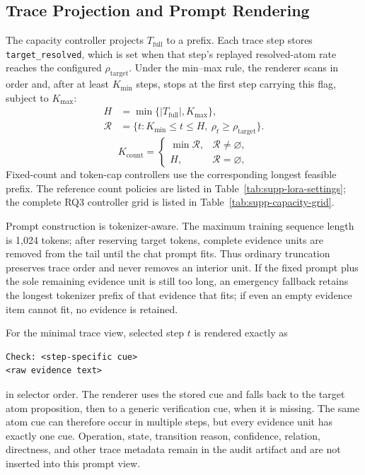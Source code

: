 \subsection{Trace Projection and Prompt Rendering}
\label{supp:projection}

The capacity controller projects \(T_{\mathrm{full}}\) to a prefix.  Each
trace step stores \texttt{target\_resolved}, which is set when that step's
replayed resolved-atom rate reaches the configured
\(\rho_{\mathrm{target}}\).  Under the min--max rule, the renderer scans in
order and, after at least \(K_{\min}\) steps, stops at the first step carrying
this flag, subject to \(K_{\max}\):
\[
\begin{aligned}
H&=\min\{|T_{\mathrm{full}}|,K_{\max}\},\\
\mathcal R&=\{t:K_{\min}\leq t\leq H,\
\rho_t\geq\rho_{\mathrm{target}}\}.
\end{aligned}
\]
\begin{equation}
K_{\mathrm{count}}=
\begin{cases}
\min\mathcal R,&\mathcal R\neq\varnothing,\\
H,&\mathcal R=\varnothing,
\end{cases}
\label{eq:supp-count-projection}
\end{equation}
Fixed-count and token-cap controllers use the corresponding longest feasible
prefix.  The
reference count policies are listed in
Table~\ref{tab:supp-lora-settings}; the complete RQ3 controller grid is
listed in Table~\ref{tab:supp-capacity-grid}.

Prompt construction is tokenizer-aware.  The maximum training sequence length
is 1,024 tokens; after reserving target tokens, complete evidence units are
removed from the tail until the chat prompt fits.  Thus ordinary truncation
preserves trace order and never removes an interior unit.  If the fixed prompt
plus the sole remaining evidence unit is still too long, an emergency
fallback retains the longest tokenizer prefix of that evidence that fits;
if even an empty evidence item cannot fit, no evidence is retained.

For the minimal trace view, selected step \(t\) is rendered exactly as
\begin{lstlisting}
Check: <step-specific cue>
<raw evidence text>
\end{lstlisting}
in selector order.  The renderer uses the stored cue and falls back to the
target atom proposition, then to a generic verification cue, when it is
missing.  The same atom cue can therefore occur in multiple steps, but every
evidence unit has exactly one cue.  Operation, state, transition reason,
confidence, relation, directness, and other trace metadata remain in the
audit artifact and are not inserted into this prompt view.

\FloatBarrier
